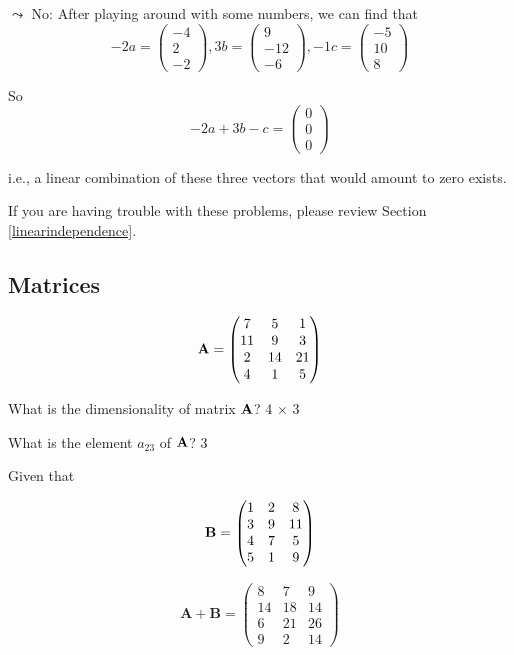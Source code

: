 \documentclass[]{book}
\theoremstyle{definition}
\theoremstyle{definition}
\theoremstyle{definition}
\theoremstyle{remark}
\begin{document}
\(\leadsto\) No: After playing around with some numbers, we can find
that
\[-2a = \begin{pmatrix} -4\\ 2\\ -2 \end{pmatrix}, 3b = \begin{pmatrix} 9\\ -12\\ -6 \end{pmatrix}, -1c = \begin{pmatrix} -5\\ 10\\ 8 \end{pmatrix}\]

So \[-2a + 3b - c = \begin{pmatrix} 0 \\ 0 \\ 0 \end{pmatrix}\]

i.e., a linear combination of these three vectors that would amount to
zero exists.

If you are having trouble with these problems, please review Section
\ref{linearindependence}.

\subsection*{Matrices}\label{matrices-1}

\[{\bf A}=\begin{pmatrix}
            7 & 5 & 1 \\
            11 & 9 & 3 \\ 
            2 & 14 & 21 \\ 
            4 & 1 & 5
        \end{pmatrix}\]

What is the dimensionality of matrix \({\bf A}\)? 4 \(\times\) 3

What is the element \(a_{23}\) of \({\bf A}\)? 3

Given that

\[{\bf B}=\begin{pmatrix}
            1 & 2 & 8 \\
            3 & 9 & 11 \\ 
            4 & 7 & 5 \\ 
            5 & 1 & 9
        \end{pmatrix}\]

\[\mathbf{A} + \mathbf{B} = \begin{pmatrix}
            8 & 7 & 9 \\
            14 & 18 & 14 \\ 
            6 & 21 & 26 \\ 
            9 & 2 & 14
        \end{pmatrix}\]
\end{document}
